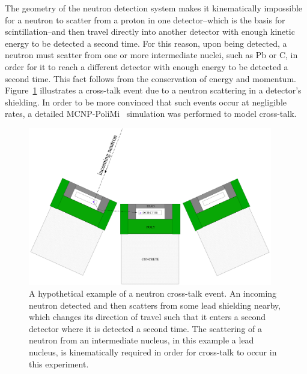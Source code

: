 The geometry of the neutron detection system makes it kinematically impossible for a neutron to scatter from a proton in one detector--which is the basis for scintillation--and then travel directly into another detector with enough kinetic energy to be detected a second time.
For this reason, upon being detected, a neutron must scatter from one or more intermediate nuclei, such as Pb or C, in order for it to reach a different detector with enough energy to be detected a second time.
This fact follows from the conservation of energy and momentum.
Figure~\ref{fig:CrossTalkExample} illustrates a cross-talk event due to a neutron scattering in a detector's shielding.
In order to be more convinced that such events occur at negligible rates, a detailed MCNP-PoliMi~\cite{MCNP_POLIMI} simulation was performed to model cross-talk.
\begin{figure}
    \centering
    \includegraphics[width = 0.95\textwidth]{Content/Errors/CrossTalkExample.png}
    \caption{A hypothetical example of a neutron cross-talk event.
An incoming neutron detected and then scatters from some lead shielding nearby, which changes its direction of travel such that it enters a second detector where it is detected a second time.
The scattering of a neutron from an intermediate nucleus, in this example a lead nucleus, is kinematically required in order for cross-talk to occur in this experiment.}
    \label{fig:CrossTalkExample}
\end{figure}

